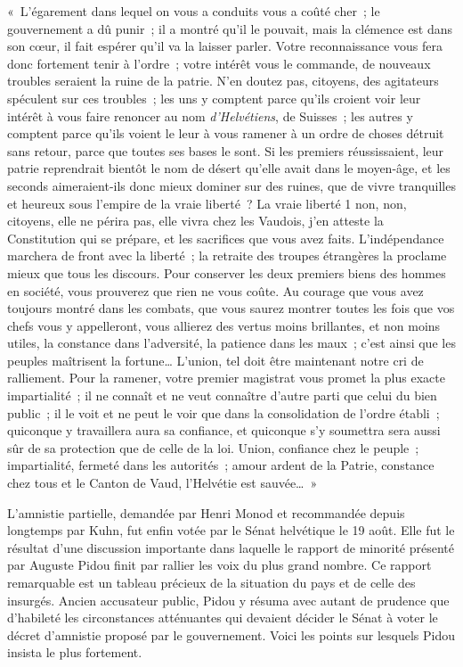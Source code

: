 \documentclass[french,twoside]{book} %
\newenvironment{quoteblock}%
  {\begin{quoting}}
  {\end{quoting}}
\newenvironment{quotebar}{%
    \def\FrameCommand{{\color{rubric!10!}\vrule width 0.5em} \hspace{0.9em}}%
    \def\OuterFrameSep{\itemsep} %
    \MakeFramed {\advance\hsize-\width \FrameRestore}
  }%
  {%
    \endMakeFramed
  }
\renewenvironment{quoteblock}%
  {%
    \savenotes
    \setstretch{0.9}
    \normalfont
    \begin{quotebar}
  }
  {%
    \end{quotebar}
    \spewnotes
  }
\begin{document}
\begin{quoteblock}
 \noindent « L’égarement dans lequel on vous a conduits vous a coûté cher ; le gouvernement a dû punir ; il a montré qu’il le pouvait, mais la clémence est dans son cœur, il fait espérer qu’il va la laisser parler. Votre reconnaissance vous fera donc fortement tenir à l’ordre ; votre intérêt vous le commande, de nouveaux troubles seraient la ruine de la patrie. N’en doutez pas, citoyens, des agitateurs spéculent sur ces troubles ; les uns y comptent parce qu’ils croient voir leur intérêt à vous faire renoncer au nom \emph{d’Helvétiens}, de Suisses ; les autres y comptent parce qu’ils voient le leur à vous ramener à un ordre de choses détruit sans retour, parce que toutes ses bases le sont. Si les premiers réussissaient, leur patrie reprendrait bientôt le nom de désert qu’elle avait dans le moyen-âge, et les seconds aimeraient-ils donc mieux dominer sur des ruines, que de vivre tranquilles et heureux sous l’empire de la vraie liberté ? La vraie liberté 1 non, non, citoyens, elle ne périra pas, elle vivra chez les Vaudois, j’en atteste la Constitution qui se prépare, et les sacrifices que vous avez faits. L’indépendance marchera de front avec la liberté ; la retraite des troupes étrangères la proclame mieux que tous les discours. Pour conserver les deux premiers biens des hommes en société, vous prouverez que rien ne vous coûte. Au courage que vous avez toujours montré dans les combats, que vous saurez montrer toutes les fois que vos chefs vous y appelleront, vous allierez des vertus moins brillantes, et non moins utiles, la constance dans l’adversité, la patience dans les maux ; c’est ainsi que les peuples maîtrisent la fortune… L’union, tel doit être maintenant notre cri de ralliement. Pour la ramener, votre premier magistrat vous promet la plus exacte impartialité ; il ne connaît et ne veut connaître d’autre parti que celui du bien public ; il le voit et ne peut le voir que dans la consolidation de l’ordre établi ; quiconque y travaillera aura sa confiance, et quiconque s’y soumettra sera aussi sûr de sa protection que de celle de la loi. Union, confiance chez le peuple ; impartialité, fermeté dans les autorités ; amour ardent de la Patrie, constance chez tous et le Canton de Vaud, l’Helvétie est sauvée… »
 \end{quoteblock}

\noindent L’amnistie partielle, demandée par Henri Monod et recommandée depuis longtemps par Kuhn, fut enfin votée par le Sénat helvétique le 19 août. Elle fut le résultat d’une discussion importante dans laquelle le rapport de minorité présenté par Auguste Pidou finit par rallier les voix du plus grand nombre. Ce rapport remarquable est un tableau précieux de la situation du pays et de celle des insurgés. Ancien accusateur public, Pidou y résuma avec autant de prudence que d’habileté les circonstances atténuantes qui devaient décider le Sénat à voter le décret d’amnistie proposé par le gouvernement. Voici les points sur lesquels Pidou insista le plus fortement.\par
\end{document}
